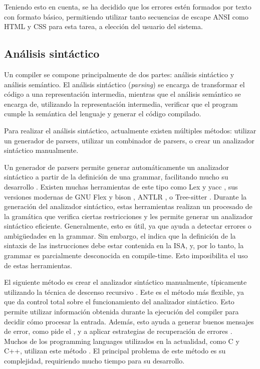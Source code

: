 Teniendo esto en cuenta, se ha decidido que los errores estén formados por texto
con formato básico, permitiendo utilizar tanto secuencias de escape ANSI como
\gls{HTML} y \gls{CSS} para esta tarea, a elección del usuario del sistema.

\subsection{Análisis sintáctico}\label{subsec:parser}

Un \gls{compiler} se compone principalmente de dos partes: análisis sintáctico y
análisis semántico. El análisis sintáctico (\textit{parsing}) se encarga de
transformar el código a una representación intermedia, mientras que el análisis
semántico se encarga de, utilizando la representación intermedia, verificar que
el \gls{program} cumple la semántica del lenguaje y generar el código compilado.
\parencite{dragon-book}

Para realizar el análisis sintáctico, actualmente existen múltiples métodos:
utilizar un generador de \glspl{parser}, utilizar un combinador de
\glspl{parser}, o crear un analizador sintáctico manualmente.
\parencite{dragon-book} \parencite{parser-combinators}

Un generador de \glspl{parser} permite generar automáticamente un analizador
sintáctico a partir de la definición de una \gls{grammar}, facilitando mucho su
desarrollo \parencite{dragon-book}. Existen muchas herramientas de este tipo
como Lex y yacc \parencite{yacc}, sus versiones modernas de GNU Flex y bison
\parencite{bison}, ANTLR \parencite{ANTLR}, o Tree-sitter
\parencite{tree-sitter}. Durante la generación del analizador sintáctico, estas
herramientas realizan un procesado de la gramática que verifica ciertas
restricciones y les permite generar un analizador sintáctico eficiente.
Generalmente, esto es útil, ya que ayuda a detectar errores o ambigüedades en la
\gls{grammar}. Sin embargo, el  indica que la
definición de la sintaxis de las instrucciones debe estar contenida en la
\gls{ISA}, y, por lo tanto, la \gls{grammar} es parcialmente desconocida en
\gls{compile-time}. Esto imposibilita el uso de estas herramientas.

El siguiente método es crear el analizador sintáctico manualmente, típicamente
utilizando la técnica de descenso recursivo \parencite{dragon-book}. Este es el
método más flexible, ya que da control total sobre el funcionamiento del
analizador sintáctico. Esto permite utilizar información obtenida durante la
ejecución del \gls{compiler} para decidir cómo procesar la entrada. Además, esto
ayuda a generar buenos mensajes de error, como pide el
, y a aplicar estrategias de recuperación de errores
\parencite{errors-clang}. Muchos de los \glspl{programming language} utilizados
en la actualidad, como C y C++, utilizan este método
\parencite{parser-types-survey}. El principal problema de este método es su
complejidad, requiriendo mucho tiempo para su desarrollo.

